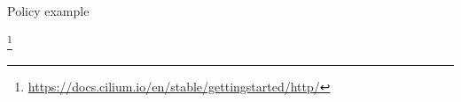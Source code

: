 \documentclass[black,white]{beamer}
\newcommand\blfootnote[1]{%
  \begingroup
  \renewcommand\thefootnote{}\footnote{#1}%
  \addtocounter{footnote}{-1}%
  \endgroup
}
\DeclareRobustCommand{\#}{\adjustbox{valign=B,totalheight=.57\baselineskip}{\oldhash}}%
\begin{document}

    \begin{frame}{Policy example}
        
        \blfootnote{\tiny \url{https://docs.cilium.io/en/stable/gettingstarted/http/}}
    \end{frame}
\end{document}

